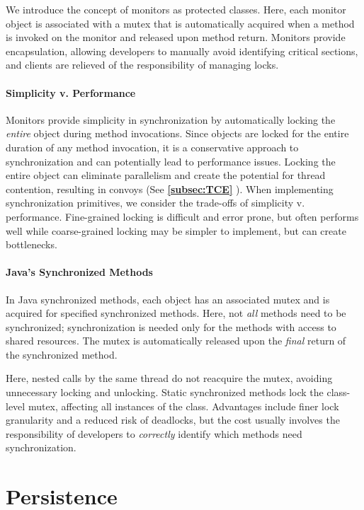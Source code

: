 \documentclass{report}
\newcommand{\refto}[2]{\textbf{\ref{#1:#2} \nameref{#1:#2}}}
\begin{document}
We introduce the concept of monitors as protected classes. Here, each monitor object is associated
with a mutex that is automatically acquired when a method is invoked on the monitor and released
upon method return. Monitors provide encapsulation, allowing developers to manually avoid
identifying critical sections, and clients are relieved of the responsibility of managing locks.


\subsection{Simplicity v. Performance}
Monitors provide simplicity in synchronization by automatically locking the \textit{entire} object
during method invocations. Since objects are locked for the entire duration of any method
invocation, it is a conservative approach to synchronization and can potentially lead to performance
issues. Locking the entire object can eliminate parallelism and create the potential for thread
contention, resulting in convoys (See \refto{subsec}{TCE}). When implementing synchronization
primitives, we consider the trade-offs of simplicity v. performance. Fine-grained locking is
difficult and error prone, but often performs well while coarse-grained locking may be simpler to
implement, but can create bottlenecks.


\subsection{Java's Synchronized Methods}
In Java synchronized methods, each object has an associated mutex and is acquired for specified
synchronized methods. Here, not \textit{all} methods need to be synchronized; synchronization is
needed only for the methods with access to shared resources. The mutex is automatically released
upon the \textit{final} return of the synchronized method.

Here, nested calls by the same thread do not reacquire the mutex, avoiding unnecessary locking and
unlocking. Static synchronized methods lock the class-level mutex, affecting all instances of the
class. Advantages include finer lock granularity and a reduced risk of deadlocks, but the cost
usually involves the responsibility of developers to \textit{correctly} identify which methods need
synchronization.










\part{Persistence}
\end{document}
